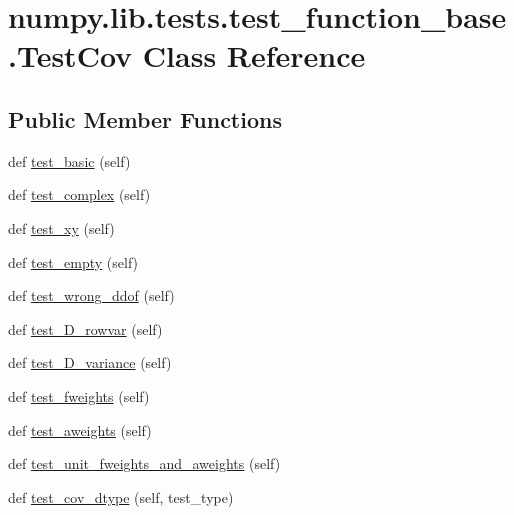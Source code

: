 \hypertarget{classnumpy_1_1lib_1_1tests_1_1test__function__base_1_1TestCov}{}\section{numpy.\+lib.\+tests.\+test\+\_\+function\+\_\+base.\+Test\+Cov Class Reference}
\label{classnumpy_1_1lib_1_1tests_1_1test__function__base_1_1TestCov}
\subsection*{Public Member Functions}
\begin{DoxyCompactItemize}
\item 
def \hyperlink{classnumpy_1_1lib_1_1tests_1_1test__function__base_1_1TestCov_a97b7ae5808511c66515b0cd539e457c8}{test\+\_\+basic} (self)
\item 
def \hyperlink{classnumpy_1_1lib_1_1tests_1_1test__function__base_1_1TestCov_a3c1f75fb80e0b793029206ea538e71c1}{test\+\_\+complex} (self)
\item 
def \hyperlink{classnumpy_1_1lib_1_1tests_1_1test__function__base_1_1TestCov_a4958d7cfb09327e2508671aa5c7e3d04}{test\+\_\+xy} (self)
\item 
def \hyperlink{classnumpy_1_1lib_1_1tests_1_1test__function__base_1_1TestCov_ac2bd23b72513b7df1fa9c6988ee85f98}{test\+\_\+empty} (self)
\item 
def \hyperlink{classnumpy_1_1lib_1_1tests_1_1test__function__base_1_1TestCov_a91c3bd97e08c699a93b31c1fa5720bbc}{test\+\_\+wrong\+\_\+ddof} (self)
\item 
def \hyperlink{classnumpy_1_1lib_1_1tests_1_1test__function__base_1_1TestCov_a2681dd63fd26942a63d297423c7494e2}{test\+\_\+D\+\_\+rowvar} (self)
\item 
def \hyperlink{classnumpy_1_1lib_1_1tests_1_1test__function__base_1_1TestCov_acc90d1bc7b9b2813afd433f7a8b7f890}{test\+\_\+D\+\_\+variance} (self)
\item 
def \hyperlink{classnumpy_1_1lib_1_1tests_1_1test__function__base_1_1TestCov_a1dc55496d3b6f6872aef0bc3300d633b}{test\+\_\+fweights} (self)
\item 
def \hyperlink{classnumpy_1_1lib_1_1tests_1_1test__function__base_1_1TestCov_a01a6cc0e3ba42b3e8a4ebb7ebc2a3007}{test\+\_\+aweights} (self)
\item 
def \hyperlink{classnumpy_1_1lib_1_1tests_1_1test__function__base_1_1TestCov_aa2313f621c3356609c6be091088f70ee}{test\+\_\+unit\+\_\+fweights\+\_\+and\+\_\+aweights} (self)
\item 
def \hyperlink{classnumpy_1_1lib_1_1tests_1_1test__function__base_1_1TestCov_a86534c42c6f872820decb900e50c3bcb}{test\+\_\+cov\+\_\+dtype} (self, test\+\_\+type)
\end{DoxyCompactItemize}
